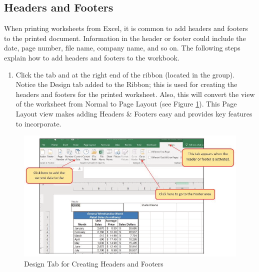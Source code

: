\subsection{Headers and Footers}

When printing worksheets from Excel, it is common to add headers and footers to the printed document. Information in the header or footer could include the date, page number, file name, company name, and so on. The following steps explain how to add headers and footers to the  workbook.

\begin{enumerate}
	\item Click the  tab and  at the right end of the ribbon (located in the  group). Notice the Design tab added to the Ribbon; this is used for creating the headers and footers for the printed worksheet. Also, this will convert the view of the worksheet from Normal to Page Layout (see Figure \ref{01:fig50}). This Page Layout view makes adding Headers \& Footers easy and provides key features to incorporate.
\end{enumerate}

\begin{figure}[H]
	\centering
	\includegraphics[width=\maxwidth{.95\linewidth}]{gfx/ch01_fig50}
	\caption{Design Tab for Creating Headers and Footers}
	\label{01:fig50}
\end{figure}

